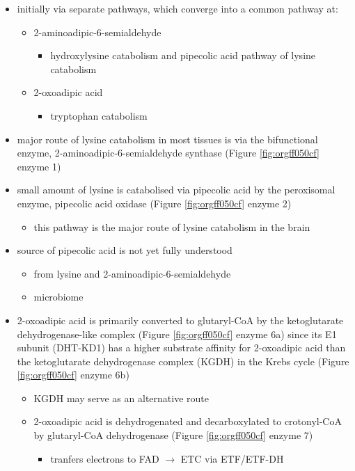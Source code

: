 \documentclass{scrartcl}
\begin{document}
\begin{itemize}
\item initially via separate pathways, which converge into a common 
pathway at:
\begin{itemize}
\item 2-aminoadipic-6-semialdehyde
\begin{itemize}
\item hydroxylysine catabolism and pipecolic acid pathway of lysine
catabolism
\end{itemize}
\item 2-oxoadipic acid
\begin{itemize}
\item tryptophan catabolism
\end{itemize}
\end{itemize}
\item major route of lysine catabolism in most tissues is via the
bifunctional enzyme, 2-aminoadipic-6-semialdehyde synthase (Figure \ref{fig:orgff050cf} enzyme 1)
\item small amount of lysine is catabolised via pipecolic acid by the
peroxisomal enzyme, pipecolic acid oxidase (Figure \ref{fig:orgff050cf} enzyme 2)
\begin{itemize}
\item this pathway is the major route of lysine catabolism in the
brain
\end{itemize}
\item source of pipecolic acid is not yet fully understood
\begin{itemize}
\item from lysine and 2-aminoadipic-6-semialdehyde
\item microbiome
\end{itemize}
\item 2-oxoadipic acid is primarily converted to glutaryl-CoA by the
ketoglutarate dehydrogenase-like complex (Figure \ref{fig:orgff050cf} enzyme 6a)
since its E1 subunit (DHT-KD1) has a higher substrate affinity for
2-oxoadipic acid than the ketoglutarate dehydrogenase complex (KGDH) in
the Krebs cycle (Figure \ref{fig:orgff050cf} enzyme 6b)
\begin{itemize}
\item KGDH may serve as an alternative route
\item 2-oxoadipic acid is dehydrogenated and decarboxylated to
crotonyl-CoA by glutaryl-CoA dehydrogenase (Figure \ref{fig:orgff050cf} enzyme 7)
\begin{itemize}
\item tranfers electrons to FAD \(\to\) ETC via ETF/ETF-DH

\end{itemize}
\end{itemize}
\end{itemize}
\end{document}

